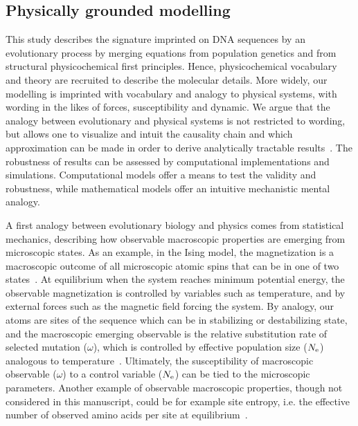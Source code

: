 \subsection{Physically grounded modelling}
This study describes the signature imprinted on \acrshort{DNA} sequences by an evolutionary process by merging equations from population genetics and from structural physicochemical first principles.
Hence, physicochemical vocabulary and theory are recruited to describe the molecular details.
More widely, our modelling is imprinted with vocabulary and analogy to physical systems, with wording in the likes of forces, susceptibility and dynamic.
We argue that the analogy between evolutionary and physical systems is not restricted to wording, but allows one to visualize and intuit the causality chain and which approximation can be made in order to derive analytically tractable results~\citep{Sella2005, Mustonen2009, Bastolla2012, Bastolla2017}.
The robustness of results can be assessed by computational implementations and simulations.
Computational models offer a means to test the validity and robustness, while mathematical models offer an intuitive mechanistic mental analogy.

A first analogy between evolutionary biology and physics comes from statistical mechanics, describing how observable macroscopic properties are emerging from microscopic states.
As an example, in the Ising model, the magnetization is a macroscopic outcome of all microscopic atomic spins that can be in one of two states~\citep{Brush1967}.
At equilibrium when the system reaches minimum potential energy, the observable magnetization is controlled by variables such as temperature, and by external forces such as the magnetic field forcing the system.
By analogy, our atoms are sites of the sequence which can be in stabilizing or destabilizing state, and the macroscopic emerging observable is the relative substitution rate of selected mutation ($\omega$), which is controlled by effective population size ($N_{\text{e}}$) analogous to temperature~\citep{Sella2005}.
Ultimately, the susceptibility of macroscopic observable ($\omega$) to a control variable ($N_{\text{e}}$) can be tied to the microscopic parameters.
Another example of observable macroscopic properties, though not considered in this manuscript, could be for example site entropy, i.e. the effective number of observed amino acids per site at equilibrium~\citep{Goldstein2016, Jimenez2018, Jiang2018}.

